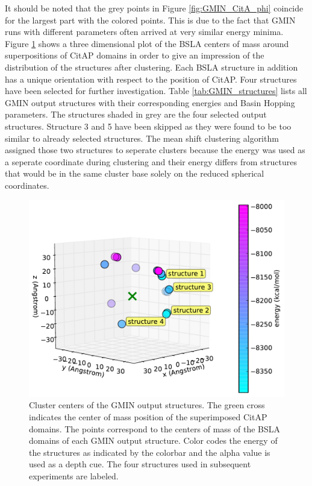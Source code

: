 \documentclass[english, a4paper, 12pt, titlepage, draft]{article}
\begin{document}
It should be noted that the grey points in Figure \ref{fig:GMIN_CitA_phi} coincide for the largest part with the colored points.
This is due to the fact that GMIN runs with different parameters often arrived at very similar energy minima.
Figure \ref{fig:GMIN_results} shows a three dimensional plot of the BSLA centers of mass around superpositions of CitAP domains in order to give an impression of the distribution of the structures after clustering.
Each BSLA structure in addition has a unique orientation with respect to the position of CitAP.
Four structures have been selected for further investigation.
Table \ref{tab:GMIN_structures} lists all GMIN output structures with their corresponding energies and Basin Hopping parameters.
The structures shaded in grey are the four selected output structures.
Structure 3 and 5 have been skipped as they were found to be too similar to already selected structures.
The mean shift clustering algorithm assigned those two structures to seperate clusters because the energy was used as a seperate coordinate during clustering and their energy differs from structures that would be in the same cluster base solely on the reduced spherical coordinates.

\begin{figure}
    \centering
    \includegraphics[width=1.0\textwidth]{figures/GMIN/CitA_phi_theta_3D.pdf}
    \caption{Cluster centers of the GMIN output structures. The green cross indicates the center of mass position of the superimposed CitAP domains. The points correspond to the centers of mass of the BSLA domains of each GMIN output structure. Color codes the energy of the structures as indicated by the colorbar and the alpha value is used as a depth cue. The four structures used in subsequent experiments are labeled.}
    \label{fig:GMIN_results}
\end{figure}       
\end{document}
